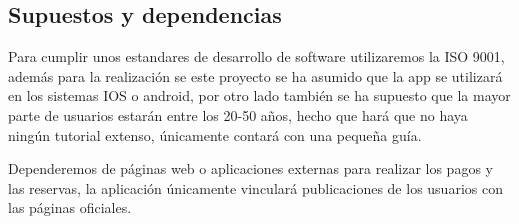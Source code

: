 \documentclass[11pt]{article}
\begin{document}
\subsection{Supuestos y dependencias}

Para cumplir unos estandares de desarrollo de software utilizaremos la ISO 9001, además para la realización se este proyecto se ha asumido que la app  se utilizará en los sistemas IOS o android, por otro lado también se ha supuesto que la mayor parte de usuarios estarán entre los 20-50 años, hecho que hará que no haya ningún tutorial extenso, únicamente contará con una pequeña guía.

Dependeremos de páginas web o aplicaciones externas para realizar los pagos y las reservas, la aplicación únicamente vinculará publicaciones de los usuarios con las páginas oficiales. 
\end{document}
